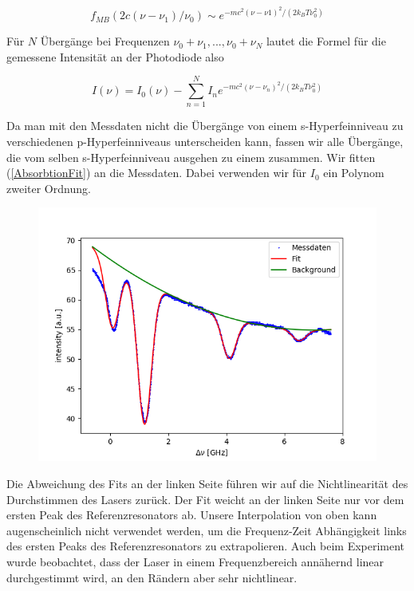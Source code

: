 \documentclass[a4paper,parskip]{scrartcl}
\begin{document}
$$f_{MB}(2c(\nu-\nu_1)/\nu_0) \sim e^{-mc^2(\nu-\nu1)^2/(2k_BT\nu_0^2)}$$

Für $N$ Übergänge bei Frequenzen $\nu_0+\nu_1,...,\nu_0+\nu_N$ lautet die Formel für die gemessene Intensität an der Photodiode also

\begin{equation}
I(\nu) = I_0(\nu) - \sum_{n=1}^N I_n e^{-mc^2(\nu-\nu_n)^2/(2k_BT\nu_0^2)}
\label{AbsorbtionFit}
\end{equation}

Da man mit den Messdaten nicht die Übergänge von einem s-Hyperfeinniveau zu verschiedenen p-Hyperfeinniveaus unterscheiden kann, fassen wir alle Übergänge, die vom selben s-Hyperfeinniveau ausgehen zu einem zusammen. Wir fitten (\ref{AbsorbtionFit}) an die Messdaten. Dabei verwenden wir für $I_0$ ein Polynom zweiter Ordnung.

\begin{figure}[h]
\includegraphics[scale = 0.5]{./absorbtion/fit.png}
\end{figure}

Die Abweichung des Fits an der linken Seite führen wir auf die Nichtlinearität des Durchstimmen des Lasers zurück. Der Fit weicht an der linken Seite nur vor dem ersten Peak des Referenzresonators ab. Unsere Interpolation von oben kann augenscheinlich nicht verwendet werden, um die Frequenz-Zeit Abhängigkeit links des ersten Peaks des Referenzresonators zu extrapolieren. Auch beim Experiment wurde beobachtet, dass der Laser in einem Frequenzbereich annähernd linear durchgestimmt wird, an den Rändern aber sehr nichtlinear.
\end{document}
